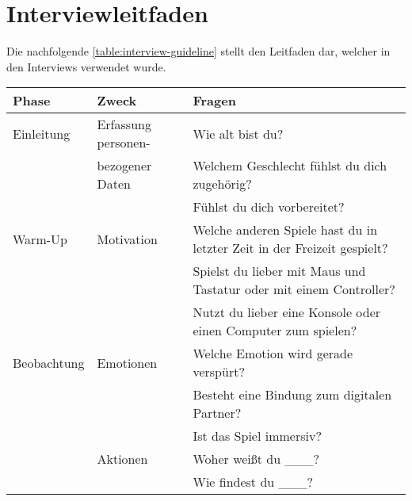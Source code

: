 \section{Interviewleitfaden}
Die nachfolgende \autoref{table:interview-guideline} stellt den Leitfaden dar, welcher in den Interviews verwendet wurde.
\begin{table}[h]
	\begin{center}
		\begin{tabularx}{\textwidth}{l|l|X}
			\textbf{Phase} & \textbf{Zweck}      & \textbf{Fragen}                                                         \\
			\hline
			Einleitung     & Erfassung personen- & Wie alt bist du?                                                        \\
			               & bezogener Daten     & Welchem Geschlecht fühlst du dich zugehörig?                            \\
			               &                     & Fühlst du dich vorbereitet?
			\newline                                                                                                       \\
			Warm-Up        & Motivation          & Welche anderen Spiele hast du in letzter Zeit in der Freizeit gespielt? \\
			               &                     & Spielst du lieber mit Maus und Tastatur oder mit einem Controller?      \\
			               &                     & Nutzt du lieber eine Konsole oder einen Computer zum spielen?
			\newline                                                                                                       \\
			Beobachtung    & Emotionen           & Welche Emotion wird gerade verspürt?                                    \\
			               &                     & Besteht eine Bindung zum digitalen Partner?                             \\
			               &                     & Ist das Spiel immersiv? \newline                                        \\
			               & Aktionen            & Woher weißt du \_\_\_?                                                  \\
			               &                     & Wie findest du \_\_\_?                                                  \\

\end{tabularx}
\end{center}
\end{table}
